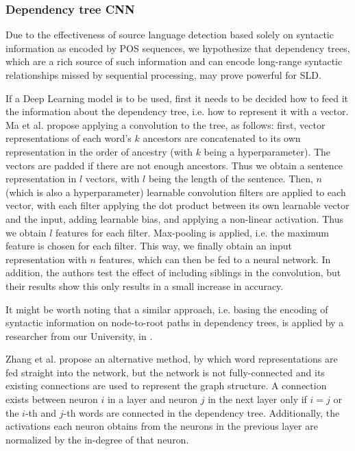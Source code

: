 \documentclass[twocolumn]{article}
\begin{document}
\subsubsection*{Dependency tree CNN}

Due to the effectiveness of source language detection based solely on syntactic information as encoded by POS sequences, we hypothesize that dependency trees, which are a rich source of such information and can encode long-range syntactic relationships missed by sequential processing, may prove powerful for SLD.

If a Deep Learning model is to be used, first it needs to be decided how to feed it the information about the dependency tree, i.e. how to represent it with a vector. Ma et al. \cite{ancestors} propose applying a convolution to the tree, as follows: first, vector representations of each word's $k$ ancestors are concatenated to its own representation in the order of ancestry (with $k$ being a hyperparameter). The vectors are padded if there are not enough ancestors. Thus we obtain a sentence representation in $l$ vectors, with $l$ being the length of the sentence. Then, $n$ (which is also a hyperparameter) learnable convolution filters are applied to each vector, with each filter applying the dot product between its own learnable vector and the input, adding learnable bias, and applying a non-linear activation. Thus we obtain $l$ features for each filter. Max-pooling is applied, i.e. the maximum feature is chosen for each filter. This way, we finally obtain an input representation with $n$ features, which can then be fed to a neural network. In addition, the authors test the effect of including siblings in the convolution, but their results show this only results in a small increase in accuracy.

It might be worth noting that a similar approach, i.e. basing the encoding of syntactic information on node-to-root paths in dependency trees, is applied by a researcher from our University, in \cite{kgan}.

Zhang et al. \cite{adjacency} propose an alternative method, by which word representations are fed straight into the network, but the network is not fully-connected and its existing connections are used to represent the graph structure. A connection exists between neuron $i$ in a layer and neuron $j$ in the next layer only if $i=j$ or the $i$-th and $j$-th words are connected in the dependency tree. Additionally, the activations each neuron obtains from the neurons in the previous layer are normalized by the in-degree of that neuron.
\end{document}

